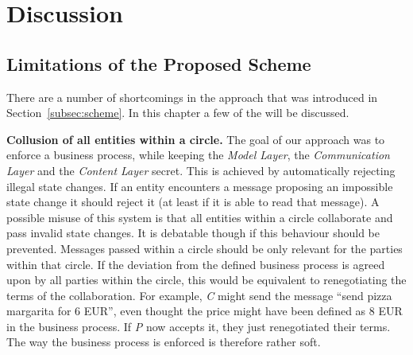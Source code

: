 \documentclass[runningheads]{llncs}
\newcommand{\comment}[1]{}
\newcommand{\ber}[1]{\textit{#1}}
\newcommand{\refsec}[1]{Section~\ref{#1}}
\renewcommand{\bigbreak}{}
\newcommand{\quotel}{``}
\newcommand{\quoter}{''}
\begin{document}
\comment{
done: 
simple implementation 
simulating a simple ring with 3 clients 
2 clients are within the same circle 
smart contract has public and is able to verify messages send from the ring

Not done: 
randomization. A client will not send the message of to a new node, rather just to the next one in line

Automatic accept/reject of messages send from node to node. User has to do that at current time.

architecture: 
Clients implemented in Python 3.6

smart contract implemented using Solidity

Application was tested using the local Ethereum application Ganache

}


\section{Discussion} \label{sec:discussion}

\subsection{Limitations of the Proposed Scheme}

There are a number of shortcomings in the approach that was introduced in \refsec{subsec:scheme}. In this chapter a few of the will be discussed.



\bigbreak
\textbf{Collusion of all entities within a circle.} The goal of our approach was to enforce a business process, while keeping the \ber{Model Layer}, the \ber{Communication Layer} and the \ber{Content Layer} secret. This is achieved by automatically rejecting illegal state changes. If an entity encounters a message proposing an impossible state change it should reject it (at least if it is able to read that message). A possible misuse of this system is that all entities within a circle collaborate and pass invalid state changes. It is debatable though if this behaviour should be prevented. Messages passed within a circle should be only relevant for the parties within that circle. If the deviation from the defined business process is agreed upon by all parties within the circle, this would be equivalent to renegotiating the terms of the collaboration. For example, \ber{C} might send the message \quotel send pizza margarita for 6 EUR\quoter , even thought the price might have been defined as 8 EUR in the business process. If \ber{P} now accepts it, they just renegotiated their terms. The way the business process is enforced is therefore rather soft. 
\end{document}

